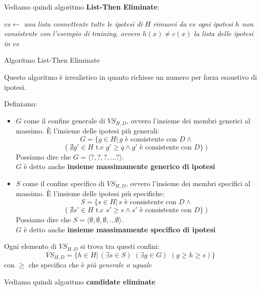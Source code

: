 \documentclass[a4paper,12pt, oneside]{book}
\begin{document}
Vediamo quindi algoritmo \textbf{List-Then Eliminate}:
\begin{algorithm}[H]
  \begin{algorithmic}
    \State $vs \gets$ \textit{una lista connettente tutte le ipotesi di } $H$
    \State \textit{rimuovi da $vs$ ogni ipotesi $h$ non consistente con}
    \State \textit{l'esempio di training, ovvero $h(x)\neq c(x)$}
    \EndFor
    \Return \textit{la lista delle ipotesi in $vs$}
    \EndFunction
  \end{algorithmic}
  \caption{Algoritmo List-Then Eliminate}
\end{algorithm}
Questo algoritmo è irrealistico in quanto richiese un numero per forza esaustivo
di ipotesi.
\begin{definizione}
  Definiamo:
  \begin{itemize}
    \item $G$ come il confine generale di $VS_{H,D}$, ovvero l'insieme dei
    membri generici al massimo. È l'insieme delle ipotesi più generali:
    \[G=\{g\in H|\, g\mbox{ è consistente con }D \land\]
    \[ (\nexists g'\in H \mbox{ t.c } g'\geq q \land g'\mbox{ è consistente con
      }D\})\]
    Possiamo dire che $G=\langle ?,?,?,\ldots ?\rangle$.\\
    $G$ è detto anche \textbf{insieme massimamente generico di ipotesi}
    \item $S$ come il confine specifico di $VS_{H,D}$, ovvero l'insieme dei
    membri specifici al massimo. È l'insieme delle ipotesi più specifiche:
     \[S=\{s\in H|\, s\mbox{ è consistente con }D \land\]
    \[ (\nexists s'\in H \mbox{ t.c } s'\geq s \land s'\mbox{ è consistente con
      }D\})\]
    Possiamo dire che $S=\langle \emptyset,\emptyset,\emptyset,\ldots \emptyset
    \rangle$.\\
        $G$ è detto anche \textbf{insieme massimamente specifico di ipotesi}

  \end{itemize}
  Ogni elemento di $VS_{H,D}$ si trova tra questi confini:
  \[VS_{H,D}=\{h\in H|\,(\exists s\in S)\,\,(\exists g\in G)\,\,(g\geq h\geq
    s)\}\]
  con $\geq$ che specifica che è \textit{più generale o uguale}
\end{definizione}
Vediamo quindi algoritmo \textbf{candidate eliminate}
\end{document}
